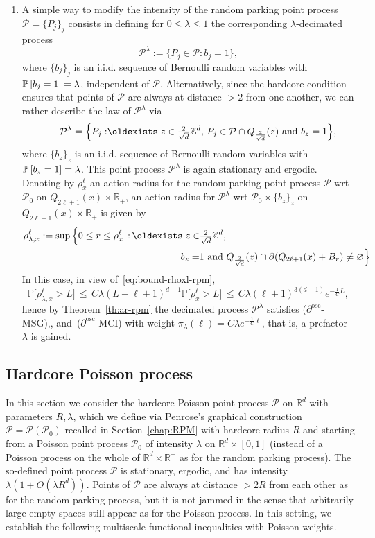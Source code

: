 \documentclass[AHL,Unicode,longabstracts]{cedram}
\newcommand{\R}{\mathbb R}
\newcommand{\Z}{\mathbb Z}
\newcommand{\pr}[1]{\mathbb{P}\left[#1 \right]}
\newcommand{\prm}[1]{\mathbb{P}\big[#1 \big]}
\newcommand{\Pc}{\mathcal P}
\newcommand{\osc}{\partial^{\mathrm{osc}}}
\renewcommand*{\exists}{\mathrel{\oldexists}}
\begin{document}
\begin{rema}
\begin{enumerate}
\item \label{rema3.4.2}A simple way to modify the intensity of the random parking point process $\Pc=\{P_j\}_j$ consists in defining for $0\le\lambda \le1$ the corresponding $\lambda$-decimated process
\[
\Pc^\lambda:=\{P_j\in\Pc:b_j=1\},
\]
where $\{b_j\}_j$ is an i.i.d. sequence of Bernoulli random variables with $\pr{b_j=1}\linebreak=\lambda$, independent of $\Pc$. Alternatively, since the hardcore condition ensures that points of $\Pc$ are always at distance $>2$ from one another, we can rather describe the law of $\Pc^\lambda$ via
\[
\qquad\Pc^\lambda=\Big\{P_j:\exists z\in\tfrac2{\sqrt d}\Z^d,\, P_j \in\Pc \cap Q_{\frac2{\sqrt{d}}}(z)\text{ and }b_z=1\Big\},
\]
where $\{b_z\}_z$ is an i.i.d. sequence of Bernoulli random variables with $\pr{b_z=1}\linebreak=\lambda$. This point process $\Pc^\lambda$ is again stationary and ergodic. Denoting by $\rho_x^\ell$ an action radius for the random parking point process $\Pc$ wrt $\Pc_0$ on $Q_{2\ell+1}(x)\times\R_+$, an action radius for $\Pc^\lambda$ wrt $\Pc_0\times\{b_z\}_z$ on $Q_{2\ell+1}(x)\times\R_+$ is given by
\begin{align*}
\rho_{\lambda,x}^\ell := \sup\Big\{0\le r\le \rho_x^\ell \,:\, \exists z\in& \tfrac2{\sqrt d} \Z^d,\\
b_z=&1\text{ and }Q_{\frac2{\sqrt{d}}}(z)\cap\partial(Q_{2\ell+1}(x)+B_r)\ne\varnothing\Big\}
\end{align*}
In this case, in view of~\eqref{eq:bound-rhoxl-rpm},
\[
\prm{\rho_{\lambda,x}^\ell>L}\,\le\,C\lambda(L+\ell+1)^{d-1}\prm{\rho_{x}^\ell>L}\,\le\,C\lambda(\ell+1)^{3(d-1)}e^{-\frac1CL},
\]
hence by Theorem~\ref{th:ar-rpm} the decimated process $\Pc^\lambda$ satisfies {($\osc$-MSG)},\linebreak{($\osc$-MLSI)}, and~{($\osc$-MCI)} with weight $\pi_\lambda(\ell)=C\lambda e^{-\frac1{C}\ell}$, that is, a prefactor $\lambda$ is gained.
\qedhere
\end{enumerate}
\end{rema}


\subsection{Hardcore Poisson process}\label{sec:hardcore}
In this section we consider the hardcore Poisson point process $\Pc$ on $\R^d$ with parameters $R,\lambda$, which we define via Penrose's graphical construction $\Pc=\Pc(\Pc_0)$ recalled in Section~\ref{chap:RPM} with hardcore radius $R$ and starting from a Poisson point process $\Pc_0$ of intensity $\lambda$ on $\R^d\times [0,1]$ (instead of a Poisson process on the whole of $\R^d\times\R^+$ as for the random parking process). The so-defined point process $\Pc$ is stationary, ergodic, and has intensity $\lambda(1+O(\lambda R^d))$. Points of $\Pc$ are always at distance $>2R$ from each other as for the random parking process, but it is not jammed in the sense that arbitrarily large empty spaces still appear as for the Poisson process. In this setting, we establish the following multiscale functional inequalities with Poisson weights.
\end{document}
